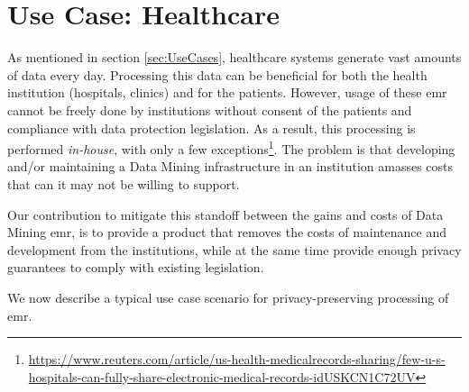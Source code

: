 
\section{Use Case: Healthcare}
\label{sec:usecaseHealthcare}


As mentioned in section \ref{sec:UseCases}, healthcare systems generate vast amounts of data every day. Processing this data can be beneficial for both the health institution (hospitals, clinics) and for the patients. However, usage of these \ac{emr} cannot be freely done by institutions without consent of the patients and compliance with data protection legislation. As a result, this processing is performed \textit{in-house}, with only a few exceptions\footnote{\url{https://www.reuters.com/article/us-health-medicalrecords-sharing/few-u-s-hospitals-can-fully-share-electronic-medical-records-idUSKCN1C72UV}}. The problem is that developing and/or maintaining a Data Mining infrastructure in an institution amasses costs that can it may not be willing to support.

Our contribution to mitigate this standoff between the gains and costs of Data Mining \ac{emr}, is to provide a product that removes the costs of maintenance and development from the institutions, while at the same time provide enough privacy guarantees to comply with existing legislation.


We now describe a typical use case scenario for privacy-preserving processing of \ac{emr}.

